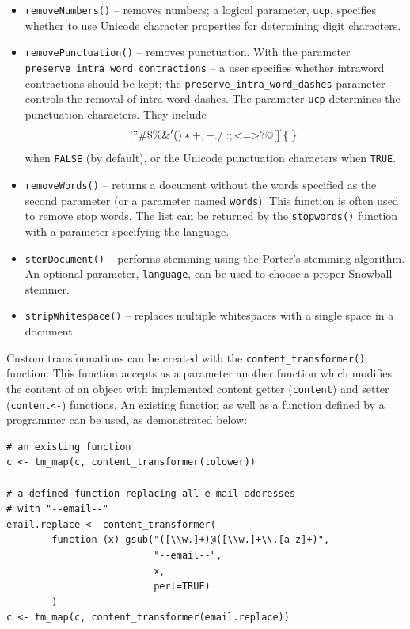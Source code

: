 \begin{itemize}
    \item \texttt{removeNumbers()} – removes numbers; a logical parameter, \texttt{ucp}, specifies whether to use Unicode character properties for determining digit
characters.

    \item \texttt{removePunctuation()} – removes punctuation. With the parameter
\texttt{preserve\_intra\_word\_contractions} – a user specifies whether intraword contractions should be kept; the 
\texttt{preserve\_intra\_word\_dashes} parameter controls the removal of intra-word dashes. 
The parameter \texttt{ucp} determines the punctuation characters. They include 
$$! " \# \$ \% \& ' ( ) * + , - . / : ; < = > ? @ [ ] ^ ` \{ | \} ~$$ when 
\texttt{FALSE} (by default), or the Unicode punctuation characters when \texttt{TRUE}.

    \item \texttt{removeWords()} – returns a document without the words specified as the
second parameter (or a parameter named \texttt{words}). This function is often
used to remove stop words. The list can be returned by the \texttt{stopwords()}
function with a parameter specifying the language.

    \item \texttt{stemDocument()} – performs stemming using the Porter’s stemming algorithm. An optional parameter, \texttt{language}, can be used to choose
a proper Snowball stemmer.

    \item \texttt{stripWhitespace()} – replaces multiple whitespaces with a single
space in a document.
\end{itemize}

Custom transformations can be created with the \texttt{content\_transformer()}
function. This function accepts as a parameter another function which modifies
the content of an object with implemented content getter (\texttt{content}) and setter
(\texttt{content<-}) functions. An existing function as well as a function defined by a
programmer can be used, as demonstrated below:


\begin{verbatim}
# an existing function
c <- tm_map(c, content_transformer(tolower))

# a defined function replacing all e-mail addresses
# with "--email--"
email.replace <- content_transformer(
        function (x) gsub("([\\w.]+)@([\\w.]+\\.[a-z]+)",
                          "--email--",
                          x,
                          perl=TRUE)
        )
c <- tm_map(c, content_transformer(email.replace))
\end{verbatim}

